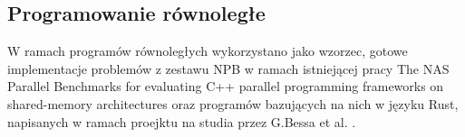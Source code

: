\subsection{Programowanie równoległe}
W ramach programów równoległych wykorzystano jako wzorzec, gotowe implementacje problemów z zestawu NPB w ramach istniejącej pracy The NAS Parallel Benchmarks for evaluating C++ parallel programming frameworks on shared-memory architectures \cite{CPPNPB} oraz programów bazujących na nich w języku Rust, napisanych w ramach proejktu na studia przez G.Bessa et al. \cite{NPBRust}.